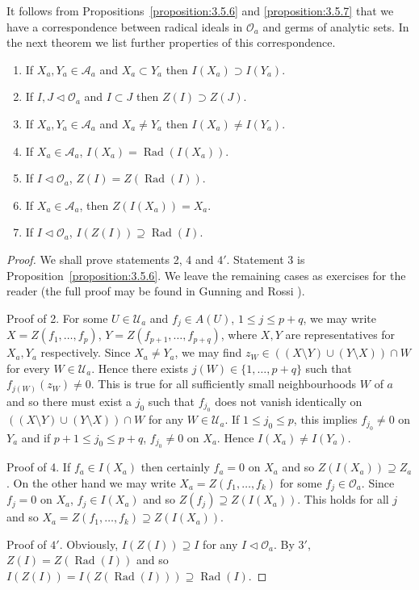 It follows from Propositions~\ref{proposition:3.5.6} and \ref{proposition:3.5.7} that we have a correspondence between radical ideals in $\mathcal O_a$ and germs of analytic sets. In the next theorem we list further properties of this correspondence.
\begin{enumerate}
\item[1.] If $X_a,Y_a\in\mathcal A_a$ and $X_a\subset Y_a$ then $I(X_a)\supset I(Y_a)$.
\item[$1'$.] If $I,J\lhd\mathcal O_a$ and $I\subset J$ then $Z(I)\supset Z(J)$.
\item[2.] If $X_a,Y_a\in\mathcal A_a$ and $X_a\ne Y_a$ then $I(X_a)\ne I(Y_a)$.
\item[3.] If $X_a\in\mathcal A_a$, $I(X_a)=\operatorname{Rad}(I(X_a))$.
\item[$3'$.] If $I\lhd\mathcal O_a$, $Z(I)=Z(\operatorname{Rad}(I))$.
\item[4.] If $X_a\in\mathcal A_a$, then $Z(I(X_a))=X_a$.
\item[$4'$.] If $I\lhd\mathcal O_a$, $I(Z(I))\supseteq\operatorname{Rad}(I)$.
\end{enumerate}
\begin{proof}
We shall prove statements 2, 4 and $4'$. Statement 3 is Proposition~\ref{proposition:3.5.6}. We leave the remaining cases as exercises for the reader (the full proof may be found in Gunning and Rossi \cite{bib:I:gunning-r-c-and-rossi-h:1}).

Proof of 2. For some $U\in\mathcal U_a$ and $f_j\in A(U)$, $1\leq j\leq p+q$, we may write $X=Z(f_1,\ldots,f_p)$, $Y=Z(f_{p+1},\ldots,f_{p+q})$, where $X,Y$ are representatives for $X_a,Y_a$ respectively. Since $X_a\ne Y_a$, we may find $z_W\in((X\setminus Y)\cup(Y\setminus X))\cap W$ for every $W\in\mathcal U_a$. Hence there exists $j(W)\in\{1,\ldots,p+q\}$ such that $f_{j(W)}(z_W)\ne0$. This is true for all sufficiently small neighbourhoods $W$ of $a$ and so there must exist a $j_0$ such that $f_{j_0}$ does not vanish identically on $((X\setminus Y)\cup(Y\setminus X))\cap W$ for any $W\in\mathcal U_a$. If $1\leq j_0\leq p$, this implies $f_{j_0}\ne0$ on $Y_a$ and if $p+1\leq j_0\leq p+q$, $f_{j_0}\ne0$ on $X_a$. Hence $I(X_a)\ne I(Y_a)$.

Proof of 4. If $f_a\in I(X_a)$ then certainly $f_a=0$ on $X_a$ and so $Z(I(X_a))\supseteq Z_a$. On the other hand we may write $X_a=Z(f_1,\ldots,f_k)$ for some $f_j\in\mathcal O_a$. Since $f_j=0$ on $X_a$, $f_j\in I(X_a)$ and so $Z(f_j)\supseteq Z(I(X_a))$. This holds for all $j$ and so $X_a=Z(f_1,\ldots,f_k)\supseteq Z(I(X_a))$.

Proof of $4'$. Obviously, $I(Z(I))\supseteq I$ for any $I\lhd\mathcal O_a$. By $3'$, $Z(I)=Z(\operatorname{Rad}(I))$ and so $I(Z(I))=I(Z(\operatorname{Rad}(I)))\supseteq\operatorname{Rad}(I)$.
\end{proof}
